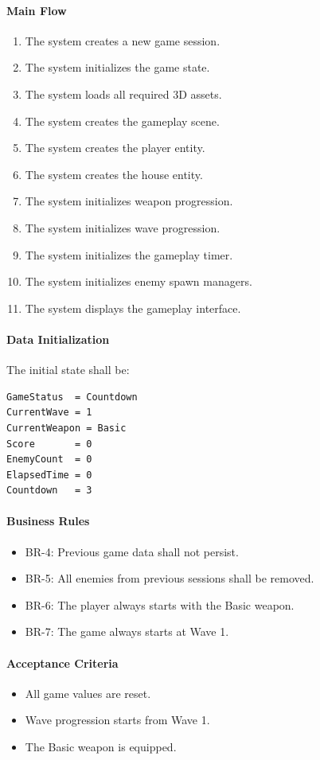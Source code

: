 \documentclass[11pt,a4paper]{article}
\begin{document}
\paragraph{Main Flow}
\begin{enumerate}
  \item The system creates a new game session.
  \item The system initializes the game state.
  \item The system loads all required 3D assets.
  \item The system creates the gameplay scene.
  \item The system creates the player entity.
  \item The system creates the house entity.
  \item The system initializes weapon progression.
  \item The system initializes wave progression.
  \item The system initializes the gameplay timer.
  \item The system initializes enemy spawn managers.
  \item The system displays the gameplay interface.
\end{enumerate}

\paragraph{Data Initialization}
The initial state shall be:
\begin{verbatim}
GameStatus  = Countdown
CurrentWave = 1
CurrentWeapon = Basic
Score       = 0
EnemyCount  = 0
ElapsedTime = 0
Countdown   = 3
\end{verbatim}

\paragraph{Business Rules}
\begin{itemize}
  \item BR-4: Previous game data shall not persist.
  \item BR-5: All enemies from previous sessions shall be removed.
  \item BR-6: The player always starts with the Basic weapon.
  \item BR-7: The game always starts at Wave 1.
\end{itemize}

\paragraph{Acceptance Criteria}
\begin{itemize}
  \item All game values are reset.
  \item Wave progression starts from Wave 1.
  \item The Basic weapon is equipped.
\end{itemize}
\end{document}
